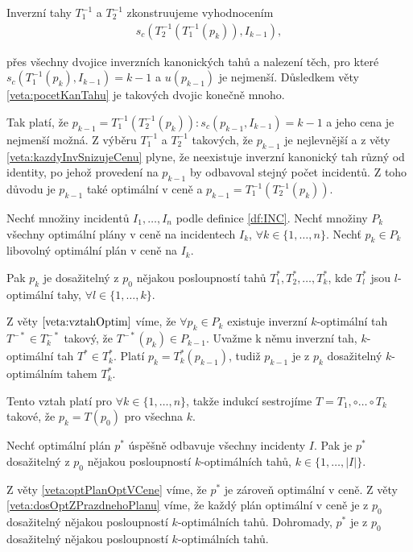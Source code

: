 \begin{dukaz}
  Inverzní tahy $T^{-1}_1$ a $T^{-1}_2$ zkonstruujeme vyhodnocením 
  \begin{align*}
  s_c(T^{-1}_2(T^{-1}_1(p_{k})), I_{k-1}),
  \end{align*}

  přes všechny dvojice inverzních kanonických tahů a nalezení těch,
  pro které $s_c(T^{-1}_1(p_{k}), I_{k-1}) = k-1$ a $u(p_{k-1})$ je nejmenší.
  Důsledkem věty \ref{veta:pocetKanTahu} je takových dvojic konečně mnoho.

  Tak platí, že $p_{k-1} = T^{-1}_1(T^{-1}_2(p_{k})) \colon s_c(p_{k-1}, I_{k-1}) = k-1$ a jeho cena je nejmenší možná.
  Z výběru $T^{-1}_1$ a $T^{-1}_2$ takových, že $p_{k-1}$ je nejlevnější a z věty \ref{veta:kazdyInvSnizujeCenu} plyne,
  že neexistuje inverzní kanonický tah různý od identity,
  po jehož provedení na $p_{k-1}$ by odbavoval stejný počet incidentů. 
  Z toho důvodu je $p_{k-1}$ také optimální v ceně a $p_{k-1} = T^{-1}_1(T^{-1}_2(p_{k}))$.
\end{dukaz}

\begin{veta}\label{veta:dosOptZPrazdnehoPlanu}
  Nechť množiny incidentů $I_1, \dots, I_n$ podle definice \ref{df:INC}.
  Nechť množiny $P_{k}$ všechny optimální plány v ceně na incidentech $I_k$, $\forall k \in \{ 1, \dots, n \}$.
  Nechť $p_k \in P_k$ libovolný optimální plán v ceně na $I_k$.

  Pak $p_k$ je dosažitelný z $p_0$ nějakou posloupností tahů $T^*_1, T^*_2, \dots, T^*_k$, kde $T^*_l$ jsou $l$-optimální tahy, $\forall l \in \{ 1, \dots, k \}$.
\end{veta}
\begin{dukaz}
  Z věty $\ref{veta:vztahOptim}$ víme, že $\forall p_k \in P_k$ existuje inverzní $k$-optimální tah $T^{-*} \in T^{-*}_k$ takový, že $T^{-*}(p_k) \in P_{k-1}$.
  Uvažme k němu inverzní tah, $k$-optimální tah $T^* \in T^{*}_k$.
  Platí $p_k = T^*_k(p_{k-1})$, tudiž $p_{k-1}$ je z $p_k$ dosažitelný $k$-optimálním tahem $T^*_k$.

  Tento vztah platí pro $\forall k \in \{ 1, \dots, n \}$, takže indukcí sestrojíme $T = T_1, \circ \dots \circ T_k$ takové, že $p_k = T(p_0)$ pro všechna $k$.
\end{dukaz}

\begin{veta}\label{veta:optJeDosaz}
  Nechť optimální plán $p^*$ úspěšně odbavuje všechny incidenty $I$.
  Pak je $p^*$ dosažitelný z $p_0$ nějakou posloupností $k$-optimálních tahů, $k \in \{ 1, \dots, |I| \}$.
\end{veta}
\begin{dukaz}
  Z věty \ref{veta:optPlanOptVCene} víme, že $p^*$ je zároveň optimální v ceně.
  Z věty \ref{veta:dosOptZPrazdnehoPlanu} víme, že každý plán optimální v ceně je z $p_0$ dosažitelný nějakou posloupností $k$-optimálních tahů.
  Dohromady, $p^*$ je z $p_0$ dosažitelný nějakou posloupností $k$-optimálních tahů.
\end{dukaz}

